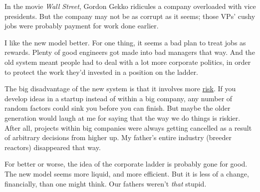 In the movie \emph{Wall Street}, Gordon Gekko ridicules a company
overloaded with vice presidents. But the company may not be as corrupt
as it seems; those VPs' cushy jobs were probably payment for work done
earlier.

I like the new model better. For one thing, it seems a bad plan to treat
jobs as rewards. Plenty of good engineers got made into bad managers
that way. And the old system meant people had to deal with a lot more
corporate politics, in order to protect the work they'd invested in a
position on the ladder.

The big disadvantage of the new system is that it involves more
\href{inequality.html}{risk}. If you develop ideas in a startup instead
of within a big company, any number of random factors could sink you
before you can finish. But maybe the older generation would laugh at me
for saying that the way we do things is riskier. After all, projects
within big companies were always getting cancelled as a result of
arbitrary decisions from higher up. My father's entire industry (breeder
reactors) disappeared that way.

For better or worse, the idea of the corporate ladder is probably gone
for good. The new model seems more liquid, and more efficient. But it is
less of a change, financially, than one might think. Our fathers weren't
\emph{that} stupid.